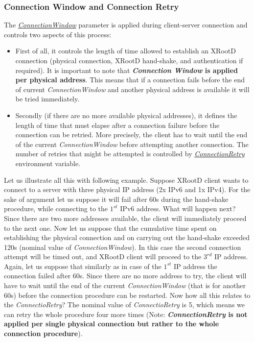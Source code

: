 \documentclass{article}
\begin{document}
		\subsubsection{Connection Window and Connection Retry}
			The \hyperref[env:connectionwindow]{\textit{ConnectionWindow}} parameter is applied during client-server connection and 
			controls two aspects of this process:
			\begin{itemize}
			  \item First of all, it controls the length of time allowed to establish an XRootD connection (physical connection, 
	  				XRootD hand-shake, and authentication if required). It is important to note that \textbf{\textit{Connection Window} 
	  				is applied per physical address}. This means that if a connection fails before the end of current 
	  				\textit{ConnectionWindow} and another physical address is available it will be tried immediately.
	  		  \item Secondly (if there are no more available physical addresses), it defines the length of time that must elapse
	  		  		after a connection failure before the connection can be retried. More precisely, the client has to wait until
	  		  		the end of the current \textit{ConnectionWindow} before attempting another connection. The number of retries 
	  		  		that might be attempted is controlled by \hyperref[env:connectionretry]{\textit{ConnectionRetry}} environment 
	  		  		variable.
			\end{itemize} 
			Let us illustrate all this with following example. Suppose XRootD client wants to connect to a server with three
			physical IP address (2x IPv6 and 1x IPv4). For the sake of argument let us suppose it will fail after 60s during the
			hand-shake procedure, while connecting to the $1^{st}$ IPv6 address. What will happen next? Since there are two more
			addresses available, the client will immediately proceed to the next one. Now let us suppose that the cumulative time
			spent on establishing the physical connection and on carrying out the hand-shake exceeded 120s (nominal value of 
			\textit{ConnectionWindow}). In this case the second connection attempt will be timed out, and XRootD client will proceed
			to the $3^{rd}$ IP address. Again, let us suppose that similarly as in case of the $1^{st}$ IP address the connection
			failed after 60s. Since there are no more address to try, the client will have to wait until the end of the current
			\textit{ConnectionWindow} (that is for another 60s) before the connection procedure can be restarted. Now how all this 
			relates to the \textit{ConnectioRetry}? The nominal value of \textit{ConnectioRetry} is 5, which means we can retry the 
			whole procedure four more times (Note: \textbf{\textit{ConnectionRetry} is not applied per single physical connection 
			but rather to the whole connection procedure}).
\end{document}
